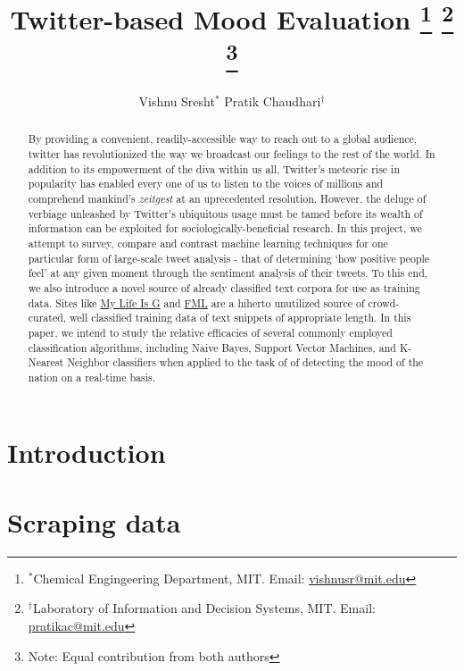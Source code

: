 \documentclass[11pt, letterpaper, conference, final, twocolumn]{ieeeconf}
\begin{document}
\title{\bf Twitter-based Mood Evaluation
	\thanks{$^*$Chemical Engingeering Department, MIT. Email: \href{mailto:vishnusr@mit.edu}{vishnusr@mit.edu}}
	\thanks{$^\dag$Laboratory of Information and Decision Systems, MIT. Email: \href{mailto:pratikac@mit.edu}{pratikac@mit.edu}}
	\thanks{Note: Equal contribution from both authors}
}
\author{Vishnu Sresht$^*$ \qquad Pratik Chaudhari$^\dag$}
\maketitle

\begin{abstract}
By providing a convenient, readily-accessible way to reach out to a global audience, twitter has revolutionized the way we broadcast our feelings to the rest of the world. In addition to its empowerment of the diva within us all, Twitter's meteoric rise in popularity has enabled every one of us to listen to the voices of millions and comprehend mankind's \textit{zeitgest} at an uprecedented resolution. However, the deluge of verbiage unleashed by Twitter's ubiquitous usage must be tamed before its wealth of information can be exploited for sociologically-beneficial research. In this project, we attempt to survey, compare and contrast machine learning techniques for one particular form of large-scale tweet analysis - that of determining `how positive people feel' at any given moment through the sentiment analysis of their tweets. To this end, we also introduce a novel source of already classified text corpora for use as training data. Sites like \href{http://mylifeisg.com}{My Life Is G} and \href{http://fmylife.com}{FML} are a hiherto unutilized source of crowd-curated, well classified training data of text snippets of appropriate length. In this paper, we intend to study the relative efficacies of several commonly employed classification algorithms, including Naive Bayes, Support Vector Machines, and K-Nearest Neighbor classifiers when applied to the task of of detecting the mood of the nation on a real-time basis.
\end{abstract}

\section{Introduction}
\label{sec:intro}



\section{Scraping data}
\label{sec:data}
\end{document}

